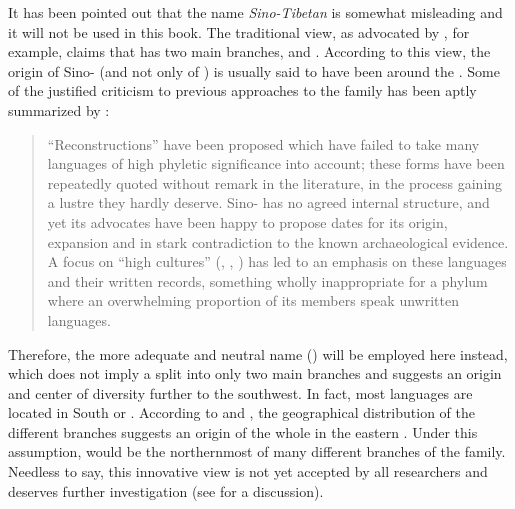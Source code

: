 It has been pointed out that the name \textit{Sino-Tibetan} is somewhat misleading and it will not be used in this book. The traditional view, as advocated by \citet{LaPolla2013}, for example, claims that  has two main branches,  and . According to this view, the origin of Sino- (and not only of ) is usually said to have been around the . Some of the justified criticism to previous approaches to the family has been aptly summarized by \citet[93]{BlenchPost2014}:

\begin{quote}
“Reconstructions” have been proposed which have failed to take many languages of high phyletic significance into account; these forms have been repeatedly quoted without remark in the literature, in the process gaining a lustre they hardly deserve. Sino- has no agreed internal structure, and yet its advocates have been happy to propose dates for its origin, expansion and  in stark contradiction to the known archaeological evidence. A focus on “high cultures” (, , ) has led to an emphasis on these languages and their written records, something wholly inappropriate for a phylum where an overwhelming proportion of its members speak unwritten languages.
\end{quote}

\noindent Therefore, the more adequate and neutral name \textit{} (\citealt{vanDriem2014}) will be employed here instead, which does not imply a split into only two main branches and suggests an origin and center of diversity further to the southwest. In fact, most  languages are located in South or . According to \citet{vanDriem2014} and \citet{BlenchPost2014}, the geographical distribution of the different branches suggests an origin of the whole  in the eastern . Under this assumption,  would be the northernmost of many different branches of the family. Needless to say, this innovative view is not yet accepted by all researchers and deserves further investigation (see \citealt{LaPolla2016} for a discussion).

